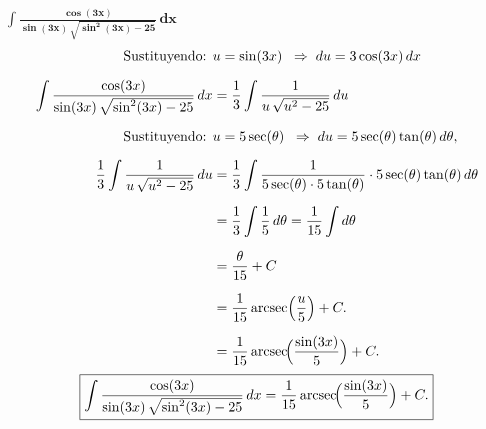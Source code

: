 $\displaystyle \mathbf{\int \frac{\cos(3x)}{\sin(3x)\,\sqrt{\sin^{2}(3x) - 25}}\,dx}$
\nopagebreak
\begin{align*}
\text{Sustituyendo: } &u = \sin(3x)
\;\;\Rightarrow\; du = 3\cos(3x)\,dx\\[6pt]
\int \frac{\cos(3x)}{\sin(3x)\,\sqrt{\sin^{2}(3x) - 25}}\,dx
&= \frac{1}{3}\int \frac{1}{u\,\sqrt{u^{2} - 25}}\,du \\[6pt]
\text{Sustituyendo: } &u = 5\sec(\theta)
\;\;\Rightarrow\; du = 5\sec(\theta)\tan(\theta)\,d\theta, \\[6pt]
\frac{1}{3}\int \frac{1}{u\,\sqrt{u^{2} - 25}}\,du
&= \frac{1}{3}\int \frac{1}{5\sec(\theta)\cdot 5\tan(\theta)}\cdot 5\sec(\theta)\tan(\theta)\,d\theta \\[6pt]
&= \frac{1}{3}\int \frac{1}{5}\,d\theta = \frac{1}{15}\int d\theta \\[6pt]
&= \frac{\theta}{15} + C \\[6pt]
&= \frac{1}{15}\,\text{arcsec}\!\left(\frac{u}{5}\right) + C. \\[6pt]
&=\frac{1}{15}\,\text{arcsec}\!\Bigl(\frac{\sin(3x)}{5}\Bigr) + C.
\end{align*}
\[
\boxed{\displaystyle 
\int \frac{\cos(3x)}{\sin(3x)\,\sqrt{\sin^{2}(3x) - 25}}\,dx
= \frac{1}{15}\,\text{arcsec}\!\Bigl(\frac{\sin(3x)}{5}\Bigr) + C.}
\]
